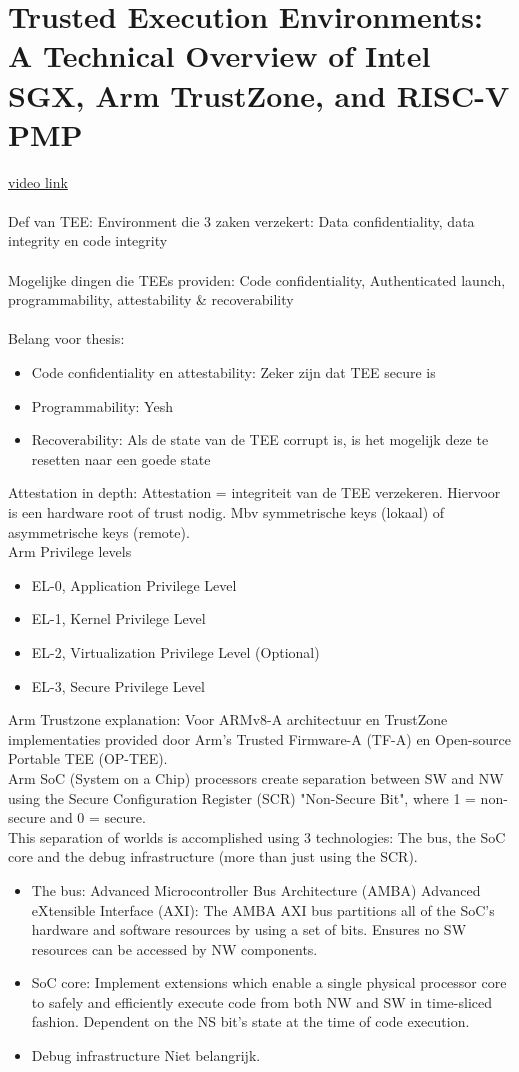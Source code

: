 \section{Trusted Execution Environments: A Technical Overview of Intel SGX, Arm TrustZone, and RISC-V PMP}
\hyperlink{https://www.youtube.com/watch?v=MREwcSo0uz4}{video link}
\\
\\
Def van TEE: Environment die 3 zaken verzekert: Data confidentiality, data integrity en code integrity
\\
\\
Mogelijke dingen die TEEs providen: Code confidentiality, Authenticated launch, programmability, attestability \& recoverability
\\
\\
Belang voor thesis: 
\begin{itemize}
    \item Code confidentiality en attestability: Zeker zijn dat TEE secure is
    \item Programmability: Yesh
    \item Recoverability: Als de state van de TEE corrupt is, is het mogelijk deze te resetten naar een goede state
\end{itemize}
Attestation in depth: Attestation = integriteit van de TEE verzekeren. Hiervoor is een hardware root of trust nodig.
Mbv symmetrische keys (lokaal) of asymmetrische keys (remote).
\\
Arm Privilege levels
\begin{itemize}
    \item EL-0, Application Privilege Level
    \item EL-1, Kernel Privilege Level
    \item EL-2, Virtualization Privilege Level (Optional)
    \item EL-3, Secure Privilege Level
\end{itemize}
Arm Trustzone explanation: Voor ARMv8-A architectuur en TrustZone implementaties provided door Arm's Trusted Firmware-A (TF-A) en Open-source Portable TEE (OP-TEE).\\
Arm SoC (System on a Chip) processors create separation between SW and NW using the Secure Configuration Register (SCR) "Non-Secure Bit", where 1 = non-secure and 0 = secure. \\
This separation of worlds is accomplished using 3 technologies: The bus, the SoC core and the debug infrastructure (more than just using the SCR).
\begin{itemize}
    \item The bus: Advanced Microcontroller Bus Architecture (AMBA) Advanced eXtensible Interface (AXI): The AMBA AXI bus partitions all of the SoC's hardware and software resources by using a set of bits. Ensures no SW resources can be accessed by NW components.
    \item SoC core: Implement extensions which enable a single physical processor core to safely and efficiently execute code from both NW and SW in time-sliced fashion. Dependent on the NS bit's state at the time of code execution.
    \item Debug infrastructure Niet belangrijk.
\end{itemize}
